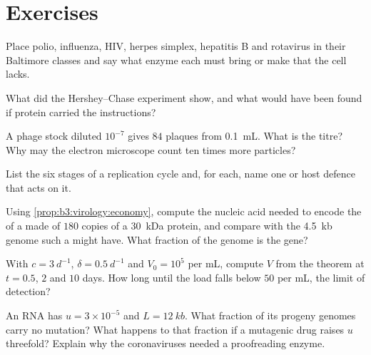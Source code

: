 \section{Exercises}

\begin{exercise}[$\star$]\label{exo:b3:virology:1}
Place polio, influenza, HIV, herpes simplex, hepatitis B and rotavirus
in their Baltimore classes and say what enzyme each must bring or make
that the cell lacks.
\end{exercise}

\begin{exercise}[$\star$]\label{exo:b3:virology:2}
What did the Hershey--Chase experiment show, and what would have been
found if protein carried the instructions?
\end{exercise}

\begin{exercise}[$\star$]\label{exo:b3:virology:3}
A phage stock diluted $10^{-7}$ gives $84$ plaques from \qty{0.1}{mL}.
What is the titre? Why may the electron microscope count ten times more
particles?
\end{exercise}

\begin{exercise}[$\star$]\label{exo:b3:virology:4}
List the six stages of a replication cycle and, for each, name one
 or host defence that acts on it.
\end{exercise}

\begin{exercise}[$\star\star$]\label{exo:b3:virology:5}
Using \cref{prop:b3:virology:economy}, compute the nucleic acid needed
to encode the  of a  made of $180$ copies of a
\qty{30}{kDa} protein, and compare with the \qty{4.5}{kb} genome such a
 might have. What fraction of the genome is the  gene?
\end{exercise}

\begin{exercise}[$\star\star$]\label{exo:b3:virology:6}
With $c = \qty{3}{d^{-1}}$, $\delta = \qty{0.5}{d^{-1}}$ and $V_{0} =
10^{5}$ per mL, compute $V$ from the theorem at $t = 0.5$, $2$ and
$10$ days. How long until the load falls below $50$ per mL, the limit
of detection?
\end{exercise}

\begin{exercise}[$\star\star$]\label{exo:b3:virology:7}
An RNA  has $u = 3\times 10^{-5}$ and $L = \qty{12}{kb}$. What
fraction of its progeny genomes carry no mutation? What happens to that
fraction if a mutagenic drug raises $u$ threefold? Explain why the
coronaviruses needed a proofreading enzyme.
\end{exercise}

